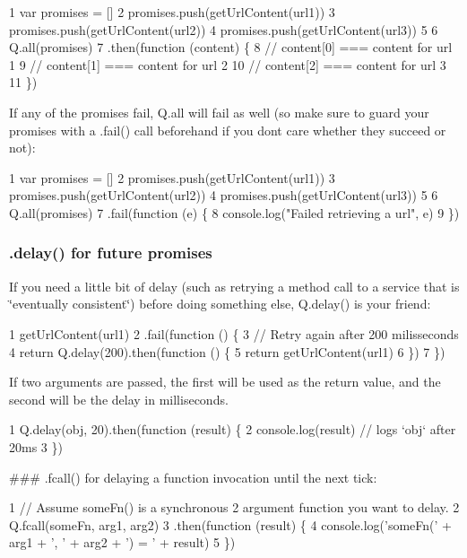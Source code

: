 \begin{DoxyCode}
1 var promises = []
2 promises.push(getUrlContent(url1))
3 promises.push(getUrlContent(url2))
4 promises.push(getUrlContent(url3))
5 
6 Q.all(promises)
7   .then(function (content) \{
8     // content[0] === content for url 1
9     // content[1] === content for url 2
10     // content[2] === content for url 3
11   \})
\end{DoxyCode}


If any of the promises fail, Q.\+all will fail as well (so make sure to guard your promises with a {\ttfamily .fail()} call beforehand if you don\textquotesingle{}t care whether they succeed or not)\+:


\begin{DoxyCode}
1 var promises = []
2 promises.push(getUrlContent(url1))
3 promises.push(getUrlContent(url2))
4 promises.push(getUrlContent(url3))
5 
6 Q.all(promises)
7   .fail(function (e) \{
8     console.log("Failed retrieving a url", e)
9   \})
\end{DoxyCode}


\subsubsection*{{\ttfamily .delay()} for future promises}

If you need a little bit of delay (such as retrying a method call to a service that is \char`\"{}eventually consistent\char`\"{}) before doing something else, {\ttfamily Q.\+delay()} is your friend\+:


\begin{DoxyCode}
1 getUrlContent(url1)
2 .fail(function () \{
3   // Retry again after 200 milisseconds
4   return Q.delay(200).then(function () \{
5     return getUrlContent(url1)
6   \})
7 \})
\end{DoxyCode}


If two arguments are passed, the first will be used as the return value, and the second will be the delay in milliseconds.


\begin{DoxyCode}
1 Q.delay(obj, 20).then(function (result) \{
2   console.log(result) // logs `obj` after 20ms
3 \})
\end{DoxyCode}


\#\#\# {\ttfamily .fcall()} for delaying a function invocation until the next tick\+: 
\begin{DoxyCode}
1 // Assume someFn() is a synchronous 2 argument function you want to delay.
2 Q.fcall(someFn, arg1, arg2)
3   .then(function (result) \{
4     console.log('someFn(' + arg1 + ', ' + arg2 + ') = ' + result)
5   \})
\end{DoxyCode}


